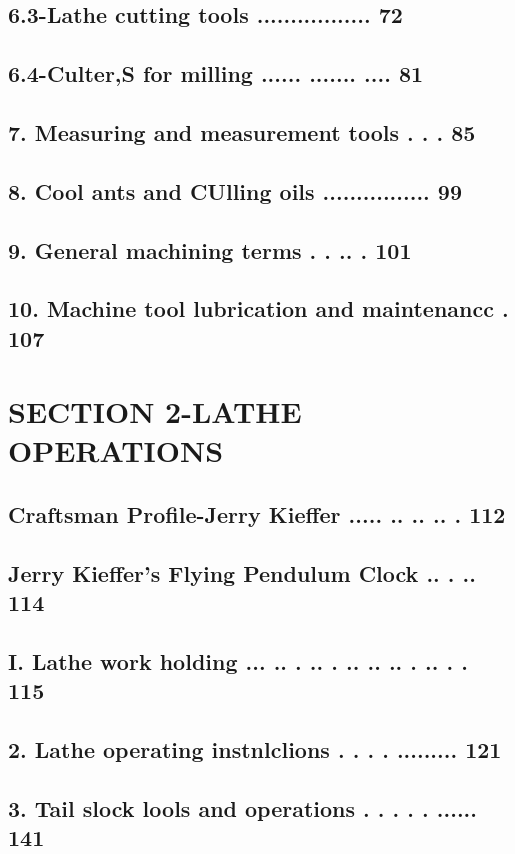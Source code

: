 \section{6.3-Lathe cutting tools ................. 72}
\section{6.4-Culter,S for milling ...... ....... .... 81}
\section{7. Measuring and measurement tools . . . 85}
\section{8. Cool ants and CUlling oils ................ 99}
\section{9. General machining terms . . .. . 101}
\section{10. Machine tool lubrication and maintenancc . 107}

\chapter{SECTION 2-LATHE OPERATIONS}
\section{Craftsman Profile-Jerry Kieffer ..... .. .. .. . 112}
\section{Jerry Kieffer's Flying Pendulum Clock .. . .. 114}
\section{I. Lathe work holding ... .. . .. . .. .. .. . .. . . 115}
\section{2. Lathe operating instnlclions . . . . ......... 121}
\section{3. Tail slock lools and operations . . . . . ...... 141}
